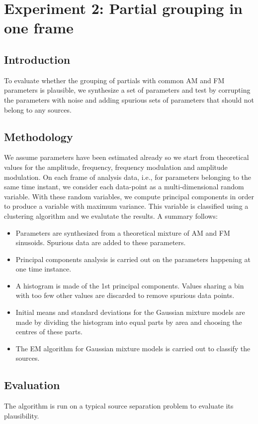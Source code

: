 \chapter{Experiment 2: Partial grouping in one frame}

\section{Introduction}
To evaluate whether the grouping of partials with common AM and FM parameters is
plausible, we synthesize a set of parameters and test by corrupting the
parameters with noise and adding spurious sets of parameters that should not
belong to any sources.

\section{Methodology}
We assume parameters have been estimated already so we start from theoretical
values for the amplitude, frequency, frequency modulation and amplitude
modulation.  On each frame of analysis data, i.e., for parameters belonging to
the same time instant, we consider each data-point as a multi-dimensional random
variable. With these random variables, we compute principal components in order
to produce a variable with maximum variance. This variable is classified using a
clustering algorithm and we evalutate the results. A summary follows:
\begin{itemize}
    \item 
        Parameters are synthesized from a theoretical mixture of AM and FM
        sinusoids.  Spurious data are added to these parameters.
    \item
        Principal components analysis is carried out on the parameters happening
        at one time instance.
    \item
        A histogram is made of the 1st principal components. Values sharing a
        bin with too few other values are discarded to remove spurious data
        points.
    \item
        Initial means and standard deviations for the Gaussian mixture models
        are made by dividing the histogram into equal parts by area and choosing
        the centres of these parts.
    \item
        The EM algorithm for Gaussian mixture models is carried out to classify
        the sources.
\end{itemize}
\section{Evaluation}
The algorithm is run on a typical source separation problem to evaluate its
plausibility.
